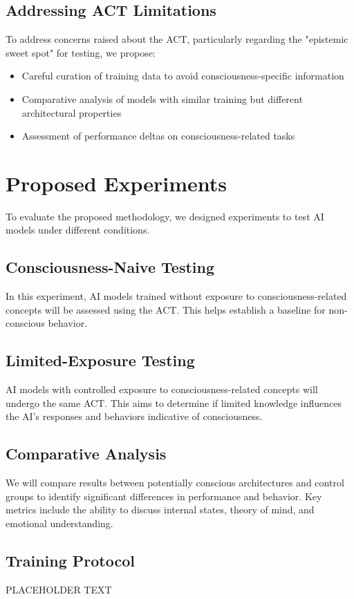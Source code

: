 \documentclass{article}
\begin{document}
\subsection{Addressing ACT Limitations}
To address concerns raised about the ACT, particularly regarding the "epistemic sweet spot" for testing, we propose:
\begin{itemize}
    \item Careful curation of training data to avoid consciousness-specific information
    \item Comparative analysis of models with similar training but different architectural properties
    \item Assessment of performance deltas on consciousness-related tasks
\end{itemize}

\section{Proposed Experiments}
To evaluate the proposed methodology, we designed experiments to test AI models under different conditions.

\subsection{Consciousness-Naive Testing}
In this experiment, AI models trained without exposure to consciousness-related concepts will be assessed using the ACT. This helps establish a baseline for non-conscious behavior.

\subsection{Limited-Exposure Testing}
AI models with controlled exposure to consciousness-related concepts will undergo the same ACT. This aims to determine if limited knowledge influences the AI's responses and behaviors indicative of consciousness.

\subsection{Comparative Analysis}
We will compare results between potentially conscious architectures and control groups to identify significant differences in performance and behavior. Key metrics include the ability to discuss internal states, theory of mind, and emotional understanding.

\subsection{Training Protocol}
PLACEHOLDER TEXT
\end{document}
